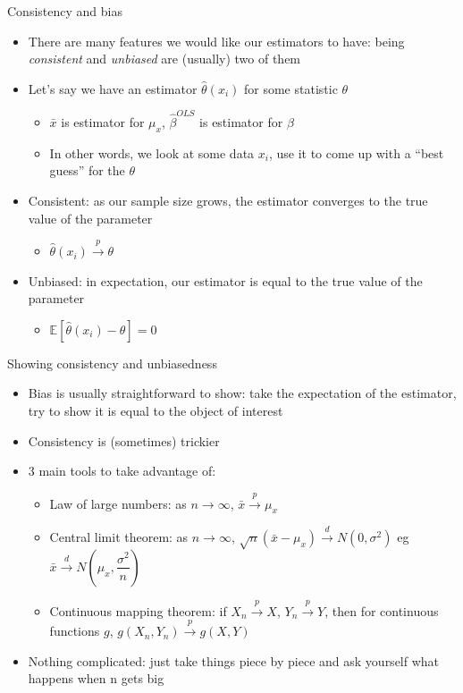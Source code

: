 \documentclass[aspectratio=169]{beamer}
\begin{document}
\begin{frame}{Consistency and bias}
    \begin{itemize}
        \item There are many features we would like our estimators to have: being \textit{consistent} and \textit{unbiased} are (usually) two of them
        \item Let's say we have an estimator $\hat{\theta}(x_i)$ for some statistic $\theta$
        \begin{itemize}
            \item $\bar{x}$ is estimator for $\mu_x$, $\hat{\beta}^{OLS}$ is estimator for $\beta$
            \item In other words, we look at some data $x_i$, use it to come up with a ``best guess'' for the $\theta$
        \end{itemize}
        \item Consistent: as our sample size grows, the estimator converges to the true value of the parameter
        \begin{itemize}
            \item $\hat{\theta}(x_i) \xrightarrow{p} \theta$
        \end{itemize}
        \item Unbiased: in expectation, our estimator is equal to the true value of the parameter
        \begin{itemize}
            \item $\mathbb{E}[\hat{\theta}(x_i) - \theta] = 0 $
        \end{itemize}
    \end{itemize}
\end{frame}

\begin{frame}{Showing consistency and unbiasedness}
    \begin{itemize}
        \item Bias is usually straightforward to show: take the expectation of the estimator, try to show it is equal to the object of interest
        \item Consistency is (sometimes) trickier
        \item 3 main tools to take advantage of:
        \begin{itemize}
            \item Law of large numbers: as $n \to \infty$, $\bar{x} \xrightarrow{p} \mu_x$
            \item Central limit theorem: as $n \to \infty$, $\sqrt{n}(\bar{x} - \mu_x) \xrightarrow{d} N(0, \sigma^2)$ eg $\bar{x} \xrightarrow{d} N(\mu_x, \dfrac{\sigma^2}{n})$
            \item Continuous mapping theorem: if $X_n \xrightarrow{p} X$, $Y_n \xrightarrow{p} Y$, then for continuous functions $g$, $g(X_n, Y_n) \xrightarrow{p} g(X,Y)$
        \end{itemize}
        \item Nothing complicated: just take things piece by piece and ask yourself what happens when n gets big
    \end{itemize}
\end{frame}
\end{document}

